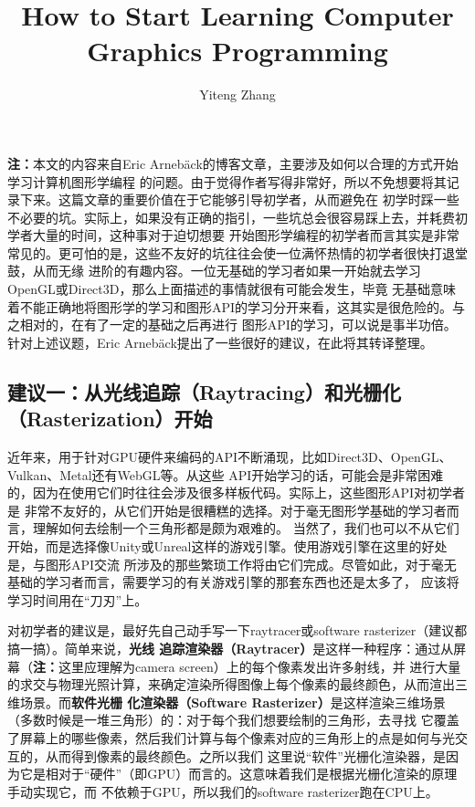 \documentclass[12pt]{article}
\title{How to Start Learning Computer Graphics Programming}
\author{Yiteng Zhang}
\begin{document}
\maketitle

\noindent{}\textbf{注：}本文的内容来自Eric Arneb\"ack的博客文章，主要涉及如何以合理的方式开始学习计算机图形学编程
的问题。由于觉得作者写得非常好，所以不免想要将其记录下来。这篇文章的重要价值在于它能够引导初学者，从而避免在
初学时踩一些不必要的坑。实际上，如果没有正确的指引，一些坑总会很容易踩上去，并耗费初学者大量的时间，这种事对于迫切想要
开始图形学编程的初学者而言其实是非常常见的。更可怕的是，这些不友好的坑往往会使一位满怀热情的初学者很快打退堂鼓，从而无缘
进阶的有趣内容。一位无基础的学习者如果一开始就去学习OpenGL或Direct3D，那么上面描述的事情就很有可能会发生，毕竟
无基础意味着不能正确地将图形学的学习和图形API的学习分开来看，这其实是很危险的。与之相对的，在有了一定的基础之后再进行
图形API的学习，可以说是事半功倍。针对上述议题，Eric Arneb\"ack提出了一些很好的建议，在此将其转译整理。

\subsection*{建议一：从光线追踪（Raytracing）和光栅化（Rasterization）开始}
\indent{}近年来，用于针对GPU硬件来编码的API不断涌现，比如Direct3D、OpenGL、Vulkan、Metal还有WebGL等。从这些
API开始学习的话，可能会是非常困难的，因为在使用它们时往往会涉及很多样板代码。实际上，这些图形API对初学者是
非常不友好的，从它们开始是很糟糕的选择。对于毫无图形学基础的学习者而言，理解如何去绘制一个三角形都是颇为艰难的。
当然了，我们也可以不从它们开始，而是选择像Unity或Unreal这样的游戏引擎。使用游戏引擎在这里的好处是，与图形API交流
所涉及的那些繁琐工作将由它们完成。尽管如此，对于毫无基础的学习者而言，需要学习的有关游戏引擎的那套东西也还是太多了，
应该将学习时间用在“刀刃”上。

\indent{}对初学者的建议是，最好先自己动手写一下raytracer或software rasterizer（建议都搞一搞）。简单来说，\textbf{光线
追踪渲染器（Raytracer）}是这样一种程序：通过从屏幕（\textbf{注：}这里应理解为camera screen）上的每个像素发出许多射线，并
进行大量的求交与物理光照计算，来确定渲染所得图像上每个像素的最终颜色，从而渲出三维场景。而\textbf{软件光栅
化渲染器（Software Rasterizer）}是这样渲染三维场景（多数时候是一堆三角形）的：对于每个我们想要绘制的三角形，去寻找
它覆盖了屏幕上的哪些像素，然后我们计算与每个像素对应的三角形上的点是如何与光交互的，从而得到像素的最终颜色。之所以我们
这里说“软件”光栅化渲染器，是因为它是相对于“硬件”（即GPU）而言的。这意味着我们是根据光栅化渲染的原理手动实现它，而
不依赖于GPU，所以我们的software rasterizer跑在CPU上。
\end{document}
